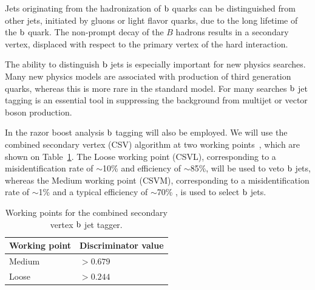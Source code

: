 Jets originating from the hadronization of $\mathrm{b}$ quarks can be distinguished from other jets,
initiated by gluons or light flavor quarks, due to the long lifetime of the $\mathrm{b}$ quark. 
The non-prompt decay of the $B$ hadrons results in a secondary vertex, displaced with respect to
the primary vertex of the hard interaction. 


The ability to distinguish $\mathrm{b}$ jets is especially important for new physics searches. Many new
physics models are associated with production of third generation quarks, whereas this is more rare
in the standard model. For many searches $\mathrm{b}$ jet tagging is an essential tool in suppressing
the background from multijet or vector boson production. 

In the razor boost analysis $\mathrm{b}$ tagging will also be employed. We will use the combined
secondary vertex (CSV) algorithm at two working points~\cite{btag7TeV,btag8TeV,BTagWP}, which are
shown on Table~\ref{tab:object_btag}. 
The Loose working point (CSVL), corresponding to a misidentification rate of $\sim$10\% and
efficiency of $\sim$85\%, will be used to veto $\mathrm{b}$ jets, whereas the Medium working point
(CSVM), corresponding to a misidentification rate of $\sim$1\% and a typical efficiency of
$\sim$70\% , is used to select $\mathrm{b}$ jets. 

\begin{table}[htdp]
\caption{Working points for the combined secondary vertex $\mathrm{b}$ jet tagger.
\label{tab:object_btag}}
\begin{center}
\begin{tabular}{l l}
\toprule
Working point & Discriminator value \\
\midrule
Medium & $> 0.679$ \\
Loose & $> 0.244$ \\
\bottomrule
\end{tabular}
\end{center}
\end{table}
% 

